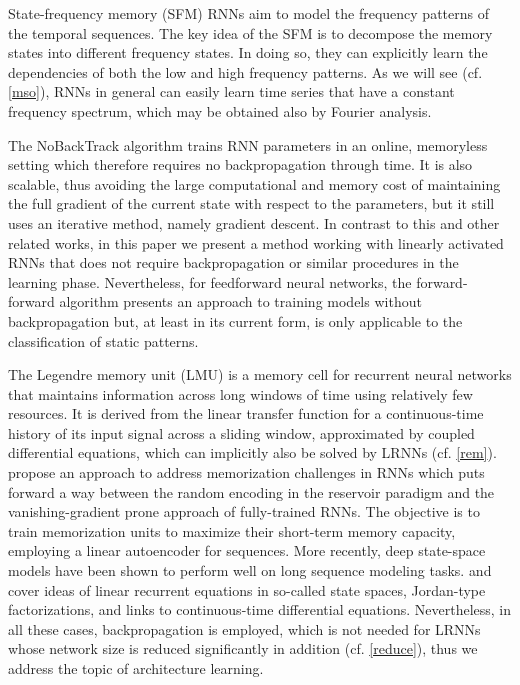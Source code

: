 \documentclass{sn-jnl}
\theoremstyle{definition}
\begin{document}
State-frequency memory (SFM) RNNs \citep{HQ17}  
aim to model the frequency patterns of the temporal sequences.
The key idea of the SFM is to decompose the memory states into different
frequency states. In doing so, they can explicitly learn the dependencies of
both the low and high frequency patterns. As we will see (cf. \cref{mso}),
RNNs in general can easily learn time series that have a constant frequency
spectrum, which may be obtained also by Fourier analysis.

The NoBackTrack algorithm \citep{OTC15} trains RNN parameters in an online, 
memoryless setting
which therefore requires no backpropagation through time. It is also scalable,
thus avoiding the large computational and memory cost of maintaining the full
gradient of the current state with respect to the parameters, but it still uses
an iterative method, namely gradient descent. In contrast to this and other
related works, in this paper we present a method working with linearly activated
RNNs that does not require backpropagation or similar procedures in the learning
phase.
Nevertheless, for feedforward neural networks, the forward-forward algorithm
\citep{Hin22} presents an approach to training models without backpropagation
but, at least in its current form, is only applicable to the classification of
static patterns.

The Legendre memory unit (LMU) \citep{VKE19} is a memory cell for recurrent
neural networks that maintains information across long windows of time using
relatively few resources. It is derived from the linear transfer function for
a continuous-time history of its input signal across a sliding window,
approximated by coupled differential equations, which can implicitly also be
solved by LRNNs (cf. \cref{rem}).
\citet{CSB21} propose an approach to address memorization challenges in RNNs
which puts forward a way between the random encoding in the reservoir paradigm
and the vanishing-gradient prone approach of fully-trained RNNs. The objective
is to train memorization units to maximize their short-term memory capacity,
employing a linear autoencoder for sequences. More recently, deep state-space
models have been shown to perform well on long sequence modeling tasks.
\citet{GGR22} and \citet{OS+23} cover ideas of linear recurrent equations in so-called state
spaces, Jordan-type factorizations, and links to continuous-time differential
equations. Nevertheless, in all these cases, backpropagation is
employed, which is not needed for LRNNs whose network size is reduced
significantly in addition (cf. \cref{reduce}), thus we address the topic of
architecture learning.
\end{document}

